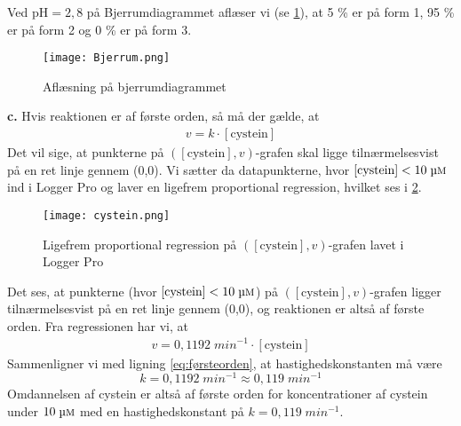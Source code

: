 \documentclass{report}
\begin{document}
Ved $\text{pH}=2,8$ på Bjerrumdiagrammet aflæser vi (se \cref{fig:Bjerrum}), at 5 \% er på form 1, 95 \% er på form 2 og 0 \% er på form 3.
\begin{figure}[H]
\begin{center}
  \texttt{[image: Bjerrum.png]}
\end{center}
\caption{Aflæsning på bjerrumdiagrammet}
\label{fig:Bjerrum}
\end{figure}
\noindent \textbf{c.}
Hvis reaktionen er af første orden, så må der gælde, at
\begin{equation}
\begin{split}
v=k \cdot [\text{cystein} ]
\end{split}
  \label{eq:førsteorden}
\end{equation}
Det vil sige, at punkterne på $([\text{cystein} ], v)$-grafen skal ligge tilnærmelsesvist på en ret linje gennem (0,0).
Vi sætter da datapunkterne, hvor $[\text{cystein} ] < 10 \;\unit{\micro \textsc{m}} $ ind i Logger Pro og laver en ligefrem proportional regression, hvilket ses i \cref{fig:cystein}.
\begin{figure}[H]
\begin{center}
  \texttt{[image: cystein.png]}
\end{center}
  \caption{Ligefrem proportional regression på $([\text{cystein} ],v)$-grafen lavet i Logger Pro}
\label{fig:cystein}
\end{figure}
Det ses, at punkterne (hvor $[\text{cystein} ] < 10 \;\unit{\micro \textsc{m}} $) på $([\text{cystein} ], v)$-grafen ligger tilnærmelsesvist på en ret linje gennem (0,0), og reaktionen er altså af første orden.
Fra regressionen har vi, at 
\begin{equation*}
\begin{split}
  v=0,1192 \;\unit{min ^{-1}} \cdot [\text{cystein} ]
\end{split}
\end{equation*}
Sammenligner vi med ligning \ref{eq:førsteorden}, at hastighedskonstanten må være
\[
k=0,1192 \;\unit{min ^{-1}} \approx 0,119 \;\unit{min ^{-1}} 
\] 
Omdannelsen af cystein er altså af første orden for koncentrationer af cystein under $10 \;\unit{\micro \textsc{m}} $ med en hastighedskonstant på $k=0,119 \;\unit{min ^{-1}} $. 
\end{document}
